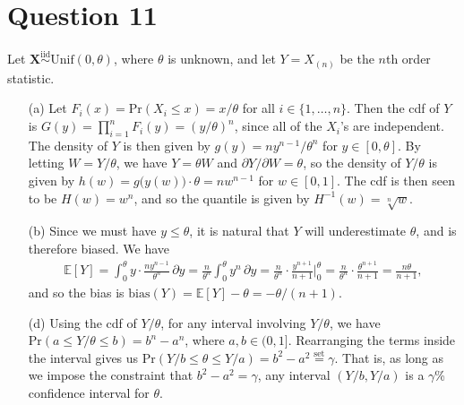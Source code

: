 \documentclass[10pt]{article}
\begin{document}
\section{Question 11} \noindent
Let \(\bm{X} \overset{\mathrm{iid}}{\sim} \mathrm{Unif}(0, \theta)\), where \(\theta\) is unknown, and let \(Y = X_{(n)}\) be the \(n\)th order statistic. 
\begin{itemize}
    \item[(a)] Let \(F_i(x) = \mathrm{Pr}(X_i \le x) = x / \theta\) for all \(i \in \{1, \ldots, n\}\). Then the cdf of \(Y\) is 
    \(G(y) = \prod_{i = 1}^n F_i(y) = \left( y / \theta \right)^n\), since all of the \(X_i\)'s are independent. The density of \(Y\) is then given by 
    \(g(y) = n y^{n - 1} / \theta^n\) for \(y \in [0, \theta]\). By letting \(W = Y / \theta\), we have \(Y = \theta W\) and \(\partial Y / \partial W = \theta\), 
    so the density of \(Y / \theta\) is given by \(h(w) = g\big( y(w) \big) \cdot \theta = n w^{n-1}\) for \(w \in [0,1]\). The cdf is then seen to be 
    \(H(w) = w^n\), and so the quantile is given by \(H^{-1}(w) = \sqrt[n]{w}\).
    \item[(b)] Since we must have \(y \le \theta\), it is natural that \(Y\) will underestimate \(\theta\), and is therefore biased. We have 
    \begin{align*}
        \mathbb{E}[Y]
        = \int_{0}^{\theta} y \cdot \frac{n y^{n-1}}{\theta^n} \,\partial y
        = \frac{n}{\theta^n} \int_0^{\theta} y^n \,\partial y
        = \frac{n}{\theta^n} \cdot \frac{y^{n+1}}{n+1} \bigg|_{0}^{\theta}
        = \frac{n}{\theta^n} \cdot \frac{\theta^{n+1}}{n+1}
        = \frac{n\theta}{n+1},
    \end{align*}
    and so the bias is \(\mathrm{bias}(Y) = \mathbb{E}[Y] - \theta = -\theta / (n+1)\). 
    \item[(d)] Using the cdf of \(Y / \theta\), for any interval involving \(Y / \theta\), we have \(\mathrm{Pr}(a \le Y / \theta \le b) = b^n - a^n\), where 
    \(a, b \in (0, 1]\). Rearranging the terms inside the interval gives us \(\mathrm{Pr}(Y / b \le \theta \le Y / a) = b^2 - a^2 \overset{\mathrm{set}}{=} \gamma\).
    That is, as long as we impose the constraint that \(b^2 - a^2 = \gamma\), any interval \((Y/b, Y/a)\) is a \(\gamma\)\%{} confidence interval for \(\theta\). 
\end{itemize}
\end{document}
